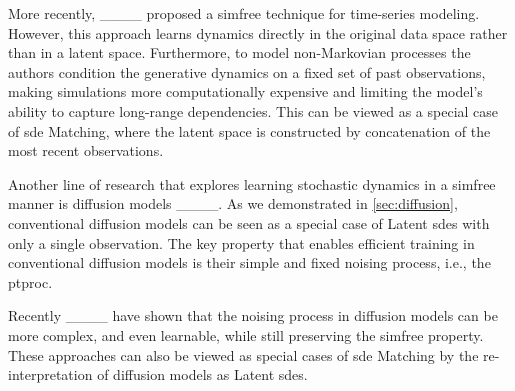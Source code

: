 More recently, ____ proposed a \gls{simfree} technique for time-series modeling. However, this approach learns dynamics directly in the original data space rather than in a latent space. Furthermore, to model non-Markovian processes the authors condition the generative dynamics on a fixed set of past observations, making simulations more computationally expensive and limiting the model's ability to capture long-range dependencies. This can be viewed as a special case of \gls{sde} Matching, where the latent space is constructed by concatenation of the most recent observations.


Another line of research that explores learning stochastic dynamics in a \gls{simfree} manner is diffusion models ____. As we demonstrated in \cref{sec:diffusion}, conventional diffusion models can be seen as a special case of Latent \glspl{sde} with only a single observation. The key property that enables efficient training in conventional diffusion models is their simple and fixed noising process, i.e., the \gls{ptproc}.


Recently ____ have shown that the noising process in diffusion models can be more complex, and even learnable, while still preserving the \gls{simfree} property. These approaches can also be viewed as special cases of \gls{sde} Matching by the re-interpretation of diffusion models as Latent \glspl{sde}.